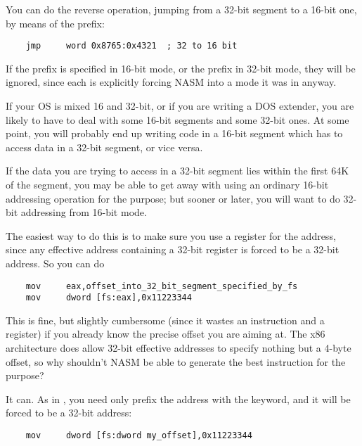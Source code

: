 You can do the reverse operation, jumping from a 32-bit segment to a
16-bit one, by means of the  prefix:

\begin{lstlisting}
    jmp     word 0x8765:0x4321  ; 32 to 16 bit
\end{lstlisting}

If the  prefix is specified in 16-bit mode, or the
 prefix in 32-bit mode, they will be ignored, since each is
explicitly forcing NASM into a mode it was in anyway.


If your OS is mixed 16 and 32-bit, or if you are writing a DOS
extender, you are likely to have to deal with some 16-bit segments
and some 32-bit ones. At some point, you will probably end up
writing code in a 16-bit segment which has to access data in a
32-bit segment, or vice versa.

If the data you are trying to access in a 32-bit segment lies within
the first 64K of the segment, you may be able to get away with using
an ordinary 16-bit addressing operation for the purpose; but sooner
or later, you will want to do 32-bit addressing from 16-bit mode.

The easiest way to do this is to make sure you use a register for
the address, since any effective address containing a 32-bit
register is forced to be a 32-bit address. So you can do

\begin{lstlisting}
    mov     eax,offset_into_32_bit_segment_specified_by_fs
    mov     dword [fs:eax],0x11223344
\end{lstlisting}

This is fine, but slightly cumbersome (since it wastes an
instruction and a register) if you already know the precise offset
you are aiming at. The x86 architecture does allow 32-bit effective
addresses to specify nothing but a 4-byte offset, so why shouldn't
NASM be able to generate the best instruction for the purpose?

It can. As in , you need only prefix the address
with the  keyword, and it will be forced to be a 32-bit
address:

\begin{lstlisting}
    mov     dword [fs:dword my_offset],0x11223344
\end{lstlisting}


